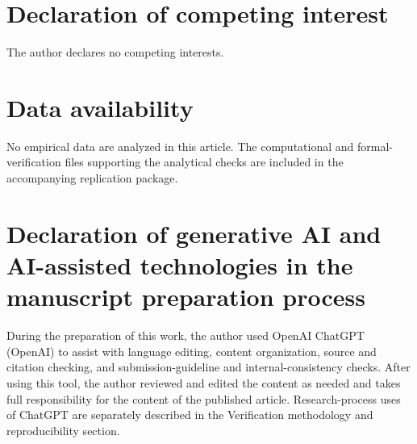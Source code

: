 \documentclass[11pt]{article}
\begin{document}
\section*{Declaration of competing interest}

The author declares no competing interests.

\section*{Data availability}

No empirical data are analyzed in this article. The computational and
formal-verification files supporting the analytical checks are included in the
accompanying replication package.

\section*{Declaration of generative AI and AI-assisted technologies in the manuscript preparation process}

During the preparation of this work, the author used OpenAI ChatGPT (OpenAI) to
assist with language editing, content organization, source and citation
checking, and submission-guideline and internal-consistency checks. After using
this tool, the author reviewed and edited the content as needed and takes full
responsibility for the content of the published article. Research-process uses
of ChatGPT are separately described in the Verification methodology and
reproducibility section.



\end{document}
